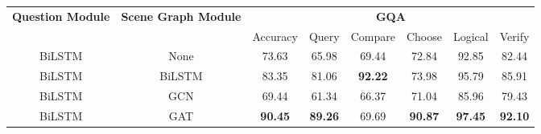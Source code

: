 \begin{table}[htbp]
\centering
\begin{footnotesize}
\begin{tabular}{cc|c|ccccc}
\toprule
\multirow{3}{0.1\textwidth}{\textbf{Question Module}} & \multirow{3}{0.1\textwidth}{\textbf{Scene Graph Module}} & \multicolumn{6}{c}{\multirow{2}{*}{\textbf{GQA}}}                                                   \\
                                          &                                              & \multicolumn{6}{c}{}                                                                                \\ \cmidrule(l){3-8} 
                                          &                                              & Accuracy       & Query          & Compare        & Choose         & Logical        & Verify         \\ \midrule
BiLSTM                                    & None                                         & 73.63          & 65.98          & 69.44          & 72.84          & 92.85          & 82.44          \\
BiLSTM                                    & BiLSTM                                       & 83.35          & 81.06          & \textbf{92.22}          & 73.98          & 95.79          & 85.91          \\
BiLSTM                                    & GCN                                          & 69.44          & 61.34          & 66.37          & 71.04          & 85.96          & 79.43          \\
BiLSTM                                    & GAT                                          & \textbf{90.45} & \textbf{89.26} & 69.69          & \textbf{90.87} & \textbf{97.45} & \textbf{92.10} \\ \bottomrule
\end{tabular}
\end{footnotesize}
\end{table}


